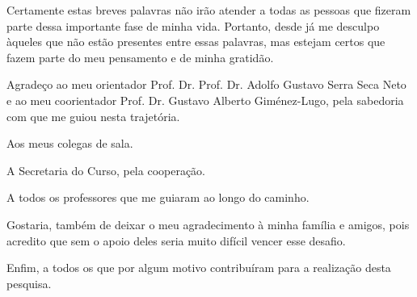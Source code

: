 
\begin{agradecimentos}%

Certamente estas breves palavras não irão atender a todas as pessoas que fizeram parte dessa importante fase de minha vida. Portanto, desde já me desculpo àqueles que não estão presentes entre essas palavras, mas estejam certos que fazem parte do meu pensamento e de minha gratidão. 

Agradeço ao meu orientador Prof. Dr. Prof. Dr. Adolfo Gustavo Serra Seca Neto e ao meu coorientador Prof. Dr. Gustavo Alberto Giménez-Lugo, pela sabedoria com que me guiou nesta trajetória.

Aos meus colegas de sala.

A Secretaria do Curso, pela cooperação.

A todos os professores que me guiaram ao longo do caminho.

Gostaria, também de deixar o meu agradecimento à minha família e amigos, pois acredito que sem o apoio deles seria muito difícil vencer esse desafio. 

Enfim, a todos os que por algum motivo contribuíram para a realização desta pesquisa.


\end{agradecimentos}
